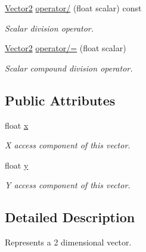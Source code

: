 \begin{DoxyCompactItemize}
\hyperlink{classchaos_1_1gfx_1_1_vector2}{Vector2} \hyperlink{classchaos_1_1gfx_1_1_vector2_a86fcd257dd859953cafffd69be1616f8}{operator/} (float scalar) const 
\begin{DoxyCompactList}\small\item\em Scalar division operator. \end{DoxyCompactList}\item 
\hyperlink{classchaos_1_1gfx_1_1_vector2}{Vector2} \hyperlink{classchaos_1_1gfx_1_1_vector2_a38a7cb083ca406aee3cd24281cd9e775}{operator/=} (float scalar)
\begin{DoxyCompactList}\small\item\em Scalar compound division operator. \end{DoxyCompactList}\end{DoxyCompactItemize}
\subsection*{Public Attributes}
\begin{DoxyCompactItemize}
\item 
\hypertarget{classchaos_1_1gfx_1_1_vector2_a98989a2809ad9c6ac3091550ad5f5118}{float \hyperlink{classchaos_1_1gfx_1_1_vector2_a98989a2809ad9c6ac3091550ad5f5118}{x}}\label{classchaos_1_1gfx_1_1_vector2_a98989a2809ad9c6ac3091550ad5f5118}

\begin{DoxyCompactList}\small\item\em X access component of this vector. \end{DoxyCompactList}\item 
\hypertarget{classchaos_1_1gfx_1_1_vector2_adf4d8ed8e49c84c2fe1596c2b9d55d49}{float \hyperlink{classchaos_1_1gfx_1_1_vector2_adf4d8ed8e49c84c2fe1596c2b9d55d49}{y}}\label{classchaos_1_1gfx_1_1_vector2_adf4d8ed8e49c84c2fe1596c2b9d55d49}

\begin{DoxyCompactList}\small\item\em Y access component of this vector. \end{DoxyCompactList}\end{DoxyCompactItemize}


\subsection{Detailed Description}
Represents a 2 dimensional vector. 

